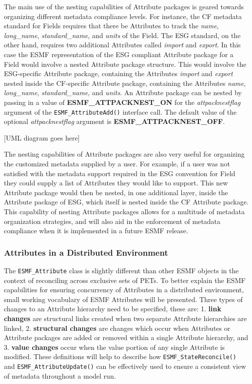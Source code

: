 The main use of the nesting capabilities of Attribute packages is geared towards organizing different metadata compliance levels.  For instance, the CF metadata standard for Fields requires that there be Attributes to track the {\it name}, {\it long\_name}, {\it standard\_name}, and {\it units} of the Field.  The ESG standard, on the other hand, requires two additional Attributes called {\it import} and {\it export}.  In this case the ESMF representation of the ESG compliant Attribute package for a Field would involve a nested Attribute package structure.  This would involve the ESG-specific Attribute package, containing the Attributes {\it import} and {\it export} nested inside the CF-specific Attribute package, containing the Attributes {\it name}, {\it long\_name}, {\it standard\_name}, and {\it units}.  An Attribute package can be nested by passing in a value of {\bf ESMF\_ATTPACKNEST\_ON} for the {\it attpacknestflag} argument of the {\tt ESMF\_AttributeAdd()} interface call.  The default value of the optional {\it attpacknestflag} argument is {\bf ESMF\_ATTPACKNEST\_OFF}.

[UML diagram goes here]

The nesting capabilities of Attribute packages are also very useful for organizing the customized metadata supplied by a user.  For example, if a user was not satisfied with the metadata support required in the ESG convention for Field they could supply a list of Attributes they would like to support.  This new Attribute package would then be nested, in one additional layer, inside the Attribute package of ESG, which itself is nested inside the CF Attribute package.  This capability of nesting Attribute packages allows for a multitude of metadata organization strategies, and will also aid in the enforcement of metadata compliance when it is implemented in a future ESMF release.

\subsubsection{Attributes in a Distributed Environment}
\label{sec:Att:Dist}

The  {\tt ESMF\_Attribute} class is slightly different than other ESMF objects in the context of reconciling across exclusive sets of PETs.  To better explain the ESMF capabilities for ensuring concurrency of Attributes in a distributed environment, small working vocabulary of ESMF Attributes will be presented.  Three types of changes to an Attribute hierarchy need to be specified, these are: 1. {\bf link changes} are structural links created when two separate Attribute hierarchies are linked, 2. {\bf structural changes} are changes which occur when Attributes or Attribute packages are added or removed within a single Attribute hierarchy, and 3. {\bf value changes} occur when the value portion of any single Attribute is modified.  These definitions will help to describe how {\tt ESMF\_StateReconcile()} and {\tt ESMF\_AttributeUpdate()} can be effectively used to ensure a consistent view of metadata throughout a model run.

